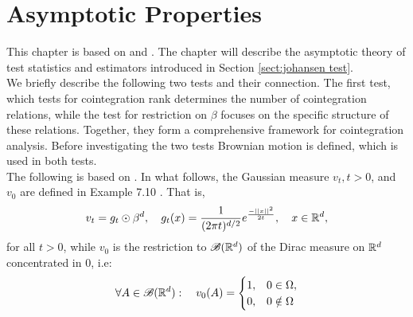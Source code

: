 \section{Asymptotic Properties}
This chapter is based on \cite{Statistica_analysis_of_cointegrating_vectors} and \cite{Modelling_of_cointegration_in_the_vector_autoregressive_model}. The chapter will describe the asymptotic theory of test statistics and estimators introduced in Section \ref{sect:johansen test}.\\

\noindent We briefly describe the following two tests and their connection. The first test, which tests for cointegration rank determines the number of cointegration relations, while the test for restriction on $\beta$ focuses on the specific structure of these relations. Together, they form a comprehensive framework for cointegration analysis. Before investigating the two tests Brownian motion is defined, which is used in both tests.\\

\noindent 
The following is based on \cite{Measure_theory_integration_theory_and_stochastic_processes}. In what follows, the Gaussian measure $v_t, t>0$, and $v_0$ are defined in Example 7.10 \cite{Measure_theory_integration_theory_and_stochastic_processes}. That is,
\begin{equation*}
    v_t=g_t \odot \beta^d, \quad g_t(x)=\frac{1}{(2\pi t)^{d/2}}e^{\frac{-||x||^2}{2t}}, \quad x\in \mathbb{R}^d,
\end{equation*}
for all $t>0$, while $v_0$ is the restriction to $\mathscr{B}(\mathbb{R}^d)$ of the Dirac measure on $\mathbb{R}^d$ concentrated in 0, i.e:
\begin{equation*}
    \forall A \in \mathscr{B}(\mathbb{R}^d): \quad v_0(A)=\begin{cases} 
1,& 0 \in \Omega, \\
0,& 0 \notin \Omega
\end{cases}
\end{equation*}


